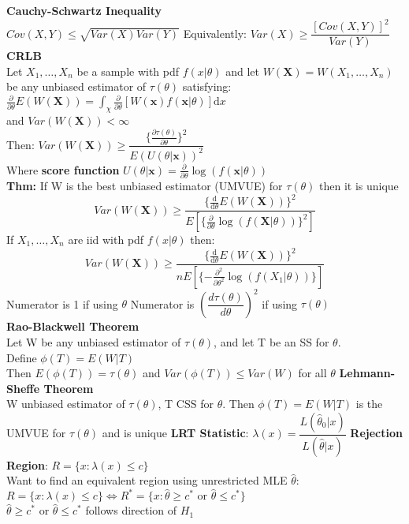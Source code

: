 \documentclass{article}
\newcommand{\deriv}[1]{\frac{\mathrm{d}}{\mathrm{d}#1}}
\newcommand{\pderiv}[2]{\frac{\partial #1}{\partial #2}}
\newcommand{\dx}{\mathrm{d}x}
\newcommand{\hth}{\hat{\theta}}
\newcommand{\lra}{\Leftrightarrow}
\newcommand{\ta}{\theta}
\newcommand{\lx}{\lambda(x)}
\begin{document}
\begin{flushleft}
\textbf{Cauchy-Schwartz Inequality}\\
$Cov(X,Y)\leq \sqrt{Var(X)Var(Y)}$\medbreak 
Equivalently: $Var(X)\geq \dfrac{[Cov(X,Y)]^2}{Var(Y)}$\medbreak
\textbf{CRLB}\\
Let $X_1,\dots,X_n$ be a sample with pdf $f(x|\ta)$ and let $W(\bm{X})=W(X_1,\dots,X_n)$ be any unbiased estimator of $\tau(\ta)$ satisfying:\\
$\pderiv{}{\ta}E(W(\bm{X}))=\int_{\chi}\pderiv{}{\ta}[W(\bm{x})f(\bm{x}|\ta)]\dx$\\
and $Var(W(\bm{X}))<\infty$\\
Then: $Var(W(\bm{X}))\geq \dfrac{\{\pderiv{\tau(\ta)}{\ta}\}^2}{E(U(\ta|\bm{x}))^2}$\\
Where \textbf{score function} $U(\ta|\bm{x})=\pderiv{}{\ta}\log(f(\bm{x}|\ta))$\\
\medbreak \textbf{Thm:} If W is the best unbiased estimator (UMVUE) for $\tau(\ta)$ then it is unique\\
\[Var(W(\bm{X}))\geq \dfrac{\{\deriv{\ta}E(W(\bm{X})) \}^2 }{E\left[\{\pderiv{}{\ta}\log(f(\bm{X}|\ta)) \}^2 \right]}
\]
If $X_1,\dots,X_n$ are iid with pdf $f(x|\ta)$ then:
\[Var(W(\bm{X}))\geq \dfrac{\{\deriv{\ta}E(W(\bm{X})) \}^2 }{nE\left[\{-\pderiv{^2}{\ta^2}\log(f(X_1|\ta)) \} \right]}
\]
Numerator is 1 if using $\ta$\medbreak
Numerator is $\left(\dfrac{d\tau(\ta)}{d\ta} \right)^2$ if using $\tau(\ta)$\\
\textbf{Rao-Blackwell Theorem}\\
Let W be any unbiased estimator of $\tau(\ta)$, and let T be an SS for $\ta$.\\
Define $\phi(T)=E(W|T)$\\
Then $E(\phi(T))=\tau(\ta)$ and $Var(\phi(T))\leq Var(W)$ for all $\ta$ \medbreak 
\textbf{Lehmann-Sheffe Theorem}\\
W unbiased estimator of $\tau(\ta)$, T CSS for $\ta$. Then $\phi(T)=E(W|T)$ is the UMVUE for $\tau(\ta)$ and is unique\medbreak
\textbf{LRT Statistic}: $\lx=\dfrac{L(\hth_0|x)}{L(\hth|x)}$\medbreak
\textbf{Rejection Region}: $R=\{x:\lambda(x)\leq c\}$\\
Want to find an equivalent region using unrestricted MLE $\hth$:\\
$R=\{x:\lambda(x)\leq c\}\lra R^*=\{x:\hth\geq c^* \text{ or } \hth \leq c^* \}$\\
$\hth\geq c^* \text{ or } \hth \leq c^*$ follows direction of $H_1$\\
\end{flushleft}
\end{document}
